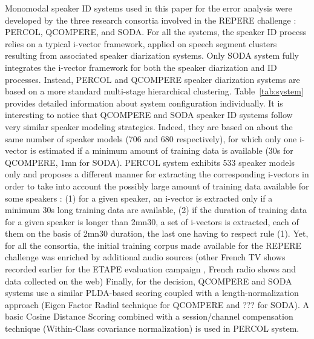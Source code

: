Monomodal speaker ID systems used in this paper for the error analysis were developed by the three research consortia involved in the REPERE challenge : PERCOL, QCOMPERE, and SODA. For all the systems, the speaker ID process relies on a typical i-vector framework, applied on speech segment clusters resulting from associated speaker diarization systems. Only SODA system  \cite{dupuy2014}  fully integrates the i-vector framework for both the speaker diarization and ID processes. Instead, PERCOL and QCOMPERE speaker diarization systems \cite{Barras2006,charlet2013} are based on a more standard multi-stage hierarchical clustering. Table~\ref{tab:system} provides detailed information about system configuration individually. It is interesting to notice that QCOMPERE and SODA speaker ID systems follow very similar speaker modeling strategies. Indeed, they are based on about the same number of speaker models (706 and 680 respectively), for which only one i-vector is estimated if a minimum amount of training data is available (30s for QCOMPERE, 1mn for SODA).  PERCOL system exhibits 533 speaker models only and proposes a different manner for extracting the corresponding i-vectors in order to take into account the possibly large amount of training data available for some speakers :  (1) for a given speaker, an i-vector is extracted only if a minimum 30s long training data are available, (2) if the duration of training data for a given speaker is longer than 2mn30, a set of i-vectors is extracted, each of them on the basis of 2mn30 duration, the last one having to respect rule (1). Yet, for all the consortia, the initial training corpus made available for the REPERE challenge was enriched by additional audio sources (other French TV shows recorded earlier for the ETAPE evaluation campaign \cite{gravier2012}, French radio shows and data collected on the web)  
Finally, for the decision, QCOMPERE and SODA systems use a similar PLDA-based scoring coupled with a length-normalization approach (Eigen Factor Radial technique for QCOMPERE and ??? for SODA). A basic Cosine Distance Scoring combined with a session/channel compensation technique (Within-Class covariance normalization)  is used in PERCOL system.

